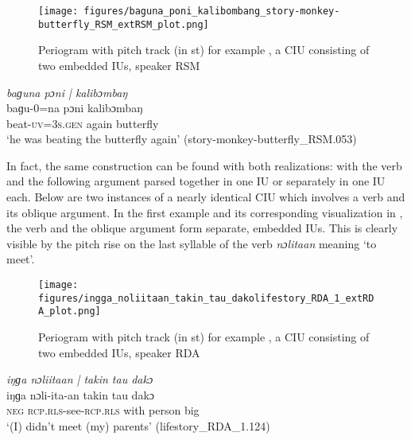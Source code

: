 \begin{figure}	
	\texttt{[image: figures/baguna\_poni\_kalibombang\_story-monkey-butterfly\_RSM\_extRSM\_plot.png]}
	\caption{Periogram with pitch track (in st) for example , a CIU consisting of two embedded IUs, speaker RSM}
	\label{pitch:baguna poni kalibombang}
\end{figure}





\ea
\label{ex:baguna poni kalibombang}
\textit{baɡu{\ü}na pɔni | kalibɔmbaŋ	} \\
\gll baɡu{\ü}-0=na pɔni kalibɔmbaŋ	 \\
beat-\textsc{uv=}3\textsc{s}.\textsc{gen} again butterfly\\ 
\glt ‘he was beating  the butterfly again’ \hfill(story-monkey-butterfly\_RSM.053)
\z




In fact, the same construction can be found with both realizations: with the verb and the following argument parsed together in one IU or separately in one IU each. Below are two instances of a nearly identical CIU which involves a verb and its oblique argument. In the first example   and its corresponding visualization in  , the verb and the oblique argument form separate, embedded IUs. This is clearly visible by the pitch rise on the last syllable of the verb \textit{nɔlitaan} meaning ‘to meet’.


\begin{figure}
	\texttt{[image: figures/ingga\_noliitaan\_takin\_tau\_dakolifestory\_RDA\_1\_extRDA\_plot.png]}
	\caption{Periogram with pitch track (in st) for example , a CIU consisting of two embedded IUs, speaker RDA}
	\label{pitch:ingga noliitaan takin tau dako}
\end{figure}



\ea
\label{ex:ingga noliitaan takin tau dako}
\textit{iŋɡa nɔliitaan | takin tau dakɔ} \\
\gll iŋɡa nɔli-ita-an takin tau dakɔ	 \\
\textsc{neg} \textsc{rcp.rls}-see-\textsc{rcp.rls} with person big\\
\glt ‘(I) didn't meet  (my) parents’ \hfill(lifestory\_RDA\_1.124)
\z





